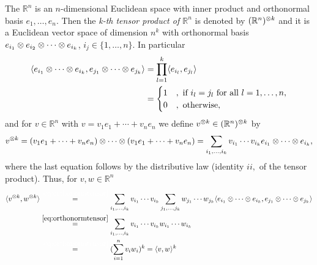 The $\mathbb{R}^n$ is an $n$-dimensional Euclidean space with inner product \sclr{\cdot}{\cdot} and orthonormal basis $e_1,\dots,e_n$.
Then the \emph{k-th tensor product of $\mathbb{R}^n$} is denoted by $(\mathbb{R}^n)^{\otimes k}$ and it is a Euclidean  vector space of dimension $n^k$ with orthonormal basis $e_{i_1}\otimes e_{i_2} \otimes \cdots \otimes e_{i_k}$, $i_j\in\{1,\dots,n\}$. In particular
\begin{align}
	\langle{e_{i_1}\ensuremath{\otimes}\cdots \ensuremath{\otimes}e_{i_k}},{e_{j_1}\otimes \cdots \otimes e_{j_k}}\rangle
	&= \prod_{l=1}^k \langle{e_{i_l}},{e_{j_l}}\rangle\nonumber\\
	&=\begin{cases}
		1 & , \text{ if } i_l=j_l \text{ for all } l=1,\dots,n,\\
		0 & , \text{ otherwise},
	\end{cases} \label{eq:orthonormtensor}
\end{align}
and for $v\in\mathbb{R}^n$ with $v=v_1e_1+\cdots +v_ne_n$ we define $v^{\otimes k} \in (\mathbb{R}^n)^{\otimes k}$ by 
\begin{equation}
	v^{\otimes k} = (v_1e_1 + \cdots + v_ne_n) \otimes \cdots \otimes (v_1e_1 + \cdots + v_ne_n) = \sum_{i_1,\dots,i_k} v_{i_1}\cdots v_{i_k} e_{i_1}\otimes\cdots\otimes e_{i_k},
\end{equation}
where the last equation follows by the distributive law (identity $ii,$ of the tensor product). 
Thus, for $v,w\in\mathbb{R}^n$ 
\begin{align}
	\sclr{v^{\tensor k}}{w^{\tensor k}}
	&\overset{\textcolor{white}{\eqref*{eq:orthonormtensor}}}{=} \sum_{i_1,\dots,i_k} v_{i_1}\cdots v_{i_k} \sum_{j_1,\dots,j_k} w_{j_1}\cdots w_{j_k} \sclr{e_{i_1}\tensor\cdots\tensor e_{i_k}}{e_{j_1}\tensor\cdots\tensor e_{j_k}} \nonumber\\
	&\overset{\eqref{eq:orthonormtensor}}{=} \sum_{i_1,\dots,i_k} v_{i_1}\cdots v_{i_k}w_{i_1}\cdots w_{i_k} \nonumber\\
	&\overset{\textcolor{white}{\eqref*{eq:orthonormtensor}}}{=}(\sum_{i=1}^n v_iw_i)^k = \sclr{v}{w}^k \label{eq:kth_tensor}
\end{align}
